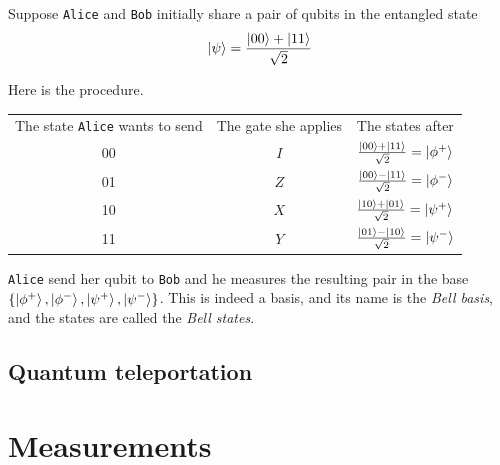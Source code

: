 \documentclass{article}
\begin{document}
Suppose \texttt{Alice} and \texttt{Bob} initially share a pair of qubits in the
entangled state
\begin{equation}
    \ket{\psi} = \frac{\ket{00} + \ket{11}}{\sqrt{2}}
\end{equation}

Here is the procedure.

\begin{table}[h]
    \centering
    \begin{tabular}{c|c|c}
    The state \texttt{Alice} wants to send & The gate she applies & The states
    after \\
    00 & $I$ & $\frac{\ket{00} + \ket{11}}{\sqrt{2}} = \ket{\phi^+}$  \\
    01 & $Z$ & $\frac{\ket{00} - \ket{11}}{\sqrt{2}} = \ket{\phi^-}$ \\
    10 & $X$ & $\frac{\ket{10} + \ket{01}}{\sqrt{2}} = \ket{\psi^+}$ \\
    11 & $Y$ & $\frac{\ket{01} - \ket{10}}{\sqrt{2}} = \ket{\psi^-}$
    \end{tabular}
\end{table}

\texttt{Alice} send her qubit to \texttt{Bob} and he measures the resulting pair
in the base \\
$\{\ket{\phi^+}, \ket{\phi^-},\ket{\psi^+}, \ket{\psi^-}\}$. This is indeed a
basis, and its name is the \textit{Bell basis}, and the states are called the
\textit{Bell states}.


\subsection{Quantum teleportation}

\section{Measurements}
\end{document}

